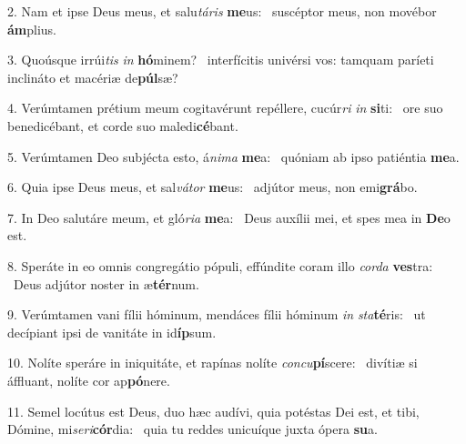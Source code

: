 2. Nam et ipse Deus meus, et salu\textit{tá}\textit{ris} \textbf{me}us: \ast\  suscéptor meus, non movébor \textbf{ám}plius.\

3. Quoúsque irrúi\textit{tis} \textit{in} \textbf{hó}minem? \ast\  interfícitis univérsi vos: tamquam paríeti inclináto et macériæ de\textbf{púl}sæ?\

4. Verúmtamen prétium meum cogitavérunt repéllere, cucúr\textit{ri} \textit{in} \textbf{si}ti: \ast\  ore suo benedicébant, et corde suo maledi\textbf{cé}bant.\

5. Verúmtamen Deo subjécta esto, á\textit{ni}\textit{ma} \textbf{me}a: \ast\  quóniam ab ipso patiéntia \textbf{me}a.\

6. Quia ipse Deus meus, et sal\textit{vá}\textit{tor} \textbf{me}us: \ast\  adjútor meus, non emi\textbf{grá}bo.\

7. In Deo salutáre meum, et gló\textit{ri}\textit{a} \textbf{me}a: \ast\  Deus auxílii mei, et spes mea in \textbf{De}o est.\

8. Speráte in eo omnis congregátio pópuli, effúndite coram illo \textit{cor}\textit{da} \textbf{ves}tra: \ast\  Deus adjútor noster in æ\textbf{tér}num.\

9. Verúmtamen vani fílii hóminum, mendáces fílii hóminum \textit{in} \textit{sta}\textbf{té}ris: \ast\  ut decípiant ipsi de vanitáte in id\textbf{íp}sum.\

10. Nolíte speráre in iniquitáte, et rapínas nolíte \textit{con}\textit{cu}\textbf{pí}scere: \ast\  divítiæ si áffluant, nolíte cor ap\textbf{pó}nere.\

11. Semel locútus est Deus, duo hæc audívi, quia potéstas Dei est, et tibi, Dómine, mi\textit{se}\textit{ri}\textbf{cór}dia: \ast\  quia tu reddes unicuíque juxta ópera \textbf{su}a.\

